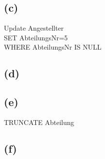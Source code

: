 \documentclass{article}
\begin{document}
\subsection{(c)}
Update Angestellter\\
SET AbteilungsNr=5\\
WHERE AbteilungsNr IS NULL\\

\subsection{(d)}



\subsection{(e)}
TRUNCATE Abteilung

\subsection{(f)}

    
\end{document}
